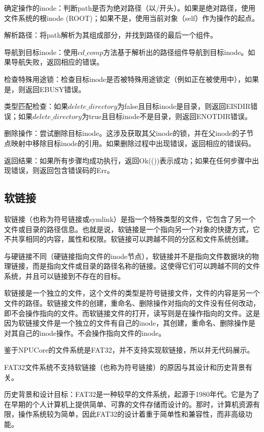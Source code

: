 确定操作的inode：判断path是否为绝对路径（以/开头）。如果是绝对路径，使用文件系统的根inode (ROOT)；如果不是，使用当前对象（self）作为操作的起点。

解析路径：将path解析为其组成部分，并找到路径的最后一个组件。

导航到目标inode：使用$cd\_comp$方法基于解析出的路径组件导航到目标inode。如果导航失败，返回相应的错误。

检查特殊用途锁：检查目标inode是否被特殊用途锁定（例如正在被使用中），如果是，则返回EBUSY错误。

类型匹配检查：如果$delete\_directory$为false且目标inode是目录，则返回EISDIR错误；如果$delete\_directory$为true且目标inode不是目录，则返回ENOTDIR错误。

删除操作：尝试删除目标inode。这涉及获取其父inode的锁，并在父inode的子节点映射中移除目标inode的引用。如果删除过程中出现错误，返回相应的错误码。

返回结果：如果所有步骤均成功执行，返回Ok(())表示成功；如果在任何步骤中出现错误，则返回包含错误码的Err。

\subsection{软链接}
软链接（也称为符号链接或symlink）是指一个特殊类型的文件，它包含了另一个文件或目录的路径信息。也就是说，软链接是一个指向另一个对象的快捷方式，它不共享相同的内容，属性和权限。软链接可以跨越不同的分区和文件系统创建。

与硬链接不同（硬链接指向文件的inode节点），软链接并不是指向文件数据块的物理链接，而是指向文件或目录的路径名称的链接。这使得它们可以跨越不同的文件系统，并且可以链接到不存在的目标。

软链接是一个独立的文件，这个文件的类型是符号链接文件，文件的内容是另一个文件的路径。软链接文件的创建，重命名、删除操作对指向的文件没有任何改动，即不会操作指向的文件。而软链接文件的打开，读写则是在操作指向的文件。这是因为软链接文件是一个独立的文件有自己的inode，其创建，重命名、删除操作是对其自己的inode操作。不会操作指向文件的inode。

鉴于NPUCore的文件系统是FAT32，并不支持实现软链接，所以并无代码展示。

FAT32文件系统不支持软链接（也称为符号链接）的原因与其设计和历史背景有关。

历史背景和设计目标：FAT32是一种较早的文件系统，起源于1980年代。它是为了在早期的个人计算机上提供简单、可靠的文件存储而设计的。那时，计算机资源有限，操作系统较为简单，因此FAT32的设计着重于简单性和兼容性，而非高级功能。


